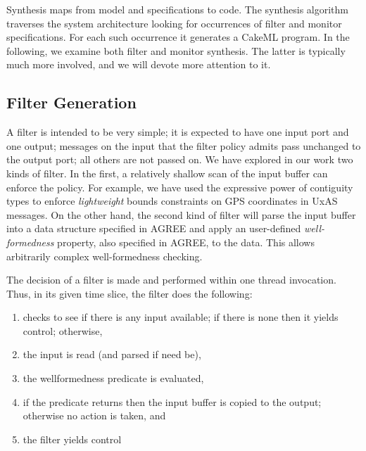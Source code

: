 Synthesis maps from model and specifications to code. The synthesis algorithm traverses the system architecture looking
for occurrences of filter and monitor specifications. For each such 
occurrence it generates a CakeML program. In the following, we examine both filter and monitor synthesis. The latter is typically much more involved, and we will devote more attention to it.

\subsection{Filter Generation}

A filter is intended to be very simple; it is expected to have one
input port and one output; messages on the input that the filter
policy admits pass unchanged to the output port; all others are not
passed on. We have explored in our work two kinds of filter. In the
first, a relatively shallow scan of the input buffer can enforce the
policy. For example, we have used the expressive power of contiguity
types \cite{contig} to enforce \emph{lightweight} bounds constraints
on GPS coordinates in UxAS messages. On the other hand, the second
kind of filter will parse the input buffer into a data structure
specified in AGREE and apply an user-defined \emph{well-formedness}
property, also specified in AGREE, to the data. This allows
arbitrarily complex well-formedness checking.

The decision of a filter is made and performed within one thread
invocation. Thus, in its given time slice, the filter does the following:

\begin{enumerate}

\item checks to see if there is any input available; if there is none
then it yields control; otherwise,

\item the input is read (and parsed if need be),

\item the wellformedness predicate is evaluated,

\item if the predicate returns  then the input buffer
 is copied to the output; otherwise no action is taken, and

\item the filter yields control
\end{enumerate}

